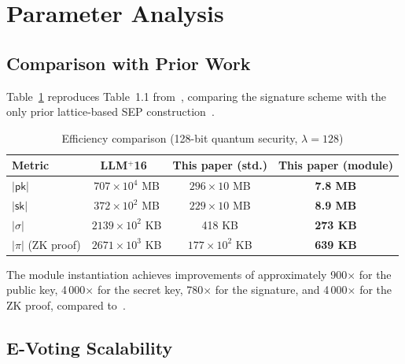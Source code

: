 \documentclass[a4paper]{article}
\newcommand{\pk}{\mathsf{pk}}
\newcommand{\sk}{\mathsf{sk}}
\newcommand{\sig}{\sigma}
\begin{document}
\section{Parameter Analysis}

\subsection{Comparison with Prior Work}

Table~\ref{tab:comparison} reproduces Table~1.1 from~\cite{mainPaper}, comparing the signature scheme with the only prior lattice-based SEP construction~\cite{LLM+16}.

\begin{table}[H]
    \centering
    \caption{Efficiency comparison (128-bit quantum security, $\lambda = 128$)}
    \label{tab:comparison}
    \begin{tabular}{lccc}
        \toprule
        \textbf{Metric}    & \textbf{LLM$^+$16~\cite{LLM+16}} & \textbf{This paper (std.)} & \textbf{This paper (module)} \\
        \midrule
        $|\pk|$            & $707 \times 10^4$ MB             & $296 \times 10$ MB         & \textbf{7.8 MB}              \\
        $|\sk|$            & $372 \times 10^2$ MB             & $229 \times 10$ MB         & \textbf{8.9 MB}              \\
        $|\sig|$           & $2139 \times 10^2$ KB            & 418 KB                     & \textbf{273 KB}              \\
        $|\pi|$ (ZK proof) & $2671 \times 10^3$ KB            & $177 \times 10^2$ KB       & \textbf{639 KB}              \\
        \bottomrule
    \end{tabular}
\end{table}

The module instantiation achieves improvements of approximately 900$\times$ for the public key, 4\,000$\times$ for the secret key, 780$\times$ for the signature, and 4\,000$\times$ for the ZK proof, compared to~\cite{LLM+16}.


\subsection{E-Voting Scalability}
\end{document}
